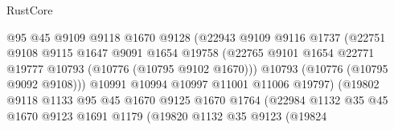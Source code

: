 \begin{lexlean}{RustCore}
\begin{coremodule}
                                      @95
                                      @45
                                      @9109
                                      @9118
                                      @1670
                                      @9128
                                      (@22943
                                        @9109
                                        @9116
                                        @1737
                                        (@22751
                                          @9108
                                          @9115
                                          @1647
                                          @9091
                                          @1654
                                          @19758
                                          (@22765
                                            @9101
                                            @1654
                                            @22771
                                            @19777
                                            @10793
                                            (@10776 (@10795 @9102 @1670)))
                                          @10793
                                          (@10776 (@10795 @9092 @9108)))
                                        @10991
                                        @10994
                                        @10997
                                        @11001
                                        @11006
                                        @19797)
                                      (@19802
                                        @9118
                                        @1133
                                        @95
                                        @45
                                        @1670
                                        @9125
                                        @1670
                                        @1764
                                        (@22984
                                          @1132
                                          @35
                                          @45
                                          @1670
                                          @9123
                                          @1691
                                          @1179
                                          (@19820
                                            @1132
                                            @35
                                            @9123
                                            (@19824

\end{coremodule}
\end{lexlean}
